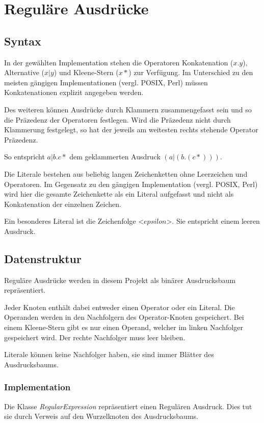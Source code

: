 \chapter{Reguläre Ausdrücke}

\section{Syntax}
In der gewählten Implementation stehen die Operatoren Konkatenation ($x.y$),
Alternative ($x|y$) und Kleene-Stern ($x*$) zur Verfügung. Im Unterschied zu den
meisten gängigen Implementationen (vergl. POSIX\cite{RegExPOSIX}, Perl\cite{RegExPerl}) müssen Konkatenationen
explizit angegeben werden.

Des weiteren können Ausdrücke durch Klammern zusammengefasst sein und so die
Präzedenz der Operatoren festlegen. Wird die Präzedenz nicht durch Klammerung
festgelegt, so hat der jeweils am weitesten rechts stehende Operator Präzedenz.

So entspricht $a|b.c*$ dem geklammerten Ausdruck $(a|(b.(c*)))$.

Die Literale bestehen aus beliebig langen Zeichenketten ohne Leerzeichen und
Operatoren. Im Gegensatz zu den gängigen Implementation (vergl. POSIX\cite{RegExPOSIX}, Perl\cite{RegExPerl}) wird
hier die gesamte Zeichenkette als ein Literal aufgefasst und nicht als Konkatenation
der einzelnen Zeichen.

Ein besonderes Literal ist die Zeichenfolge <$epsilon$>. Sie
entspricht einem leeren Ausdruck.

\section{Datenstruktur}
Reguläre Ausdrücke werden in diesem Projekt als binärer Ausdrucksbaum
repräsentiert.

Jeder Knoten enthält dabei entweder einen Operator oder ein Literal.
Die Operanden werden in den Nachfolgern des Operator-Knoten gespeichert. Bei
einem Kleene-Stern gibt es nur einen Operand, welcher im linken Nachfolger
gespeichert wird. Der rechte Nachfolger muss leer bleiben.

Literale können keine Nachfolger haben, sie sind immer Blätter des Ausdrucksbaums.

\subsection{Implementation}
Die Klasse \textit{RegularExpression} repräsentiert einen Regulären Ausdruck.
Dies tut sie durch Verweis auf den Wurzelknoten des Ausdrucksbaums.

